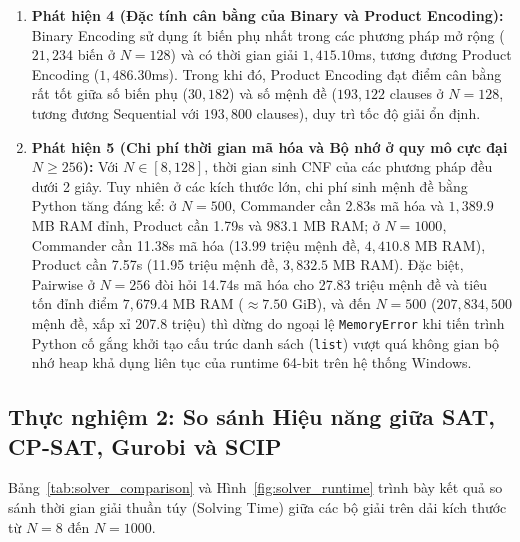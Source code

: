 \documentclass[11pt,a4paper]{article}
\begin{document}
\begin{enumerate}
    \item \textbf{Phát hiện 4 (Đặc tính cân bằng của Binary và Product Encoding):} Binary Encoding sử dụng ít biến phụ nhất trong các phương pháp mở rộng ($21{,}234$ biến ở $N=128$) và có thời gian giải $1{,}415.10$ms, tương đương Product Encoding ($1{,}486.30$ms). Trong khi đó, Product Encoding đạt điểm cân bằng rất tốt giữa số biến phụ ($30{,}182$) và số mệnh đề ($193{,}122$ clauses ở $N=128$, tương đương Sequential với $193{,}800$ clauses), duy trì tốc độ giải ổn định.
    \item \textbf{Phát hiện 5 (Chi phí thời gian mã hóa và Bộ nhớ ở quy mô cực đại $N \ge 256$):} Với $N \in [8, 128]$, thời gian sinh CNF của các phương pháp đều dưới 2 giây. Tuy nhiên ở các kích thước lớn, chi phí sinh mệnh đề bằng Python tăng đáng kể: ở $N=500$, Commander cần 2.83s mã hóa và $1{,}389.9$ MB RAM đỉnh, Product cần 1.79s và $983.1$ MB RAM; ở $N=1000$, Commander cần 11.38s mã hóa (13.99 triệu mệnh đề, $4{,}410.8$ MB RAM), Product cần 7.57s (11.95 triệu mệnh đề, $3{,}832.5$ MB RAM). Đặc biệt, Pairwise ở $N=256$ đòi hỏi 14.74s mã hóa cho 27.83 triệu mệnh đề và tiêu tốn đỉnh điểm $7{,}679.4$ MB RAM ($\approx 7.50$ GiB), và đến $N=500$ ($207{,}834{,}500$ mệnh đề, xấp xỉ 207.8 triệu) thì dừng do ngoại lệ \texttt{MemoryError} khi tiến trình Python cố gắng khởi tạo cấu trúc danh sách (\texttt{list}) vượt quá không gian bộ nhớ heap khả dụng liên tục của runtime 64-bit trên hệ thống Windows.
\end{enumerate}

\subsection{Thực nghiệm 2: So sánh Hiệu năng giữa SAT, CP-SAT, Gurobi và SCIP}
Bảng~\ref{tab:solver_comparison} và Hình~\ref{fig:solver_runtime} trình bày kết quả so sánh thời gian giải thuần túy (Solving Time) giữa các bộ giải trên dải kích thước từ $N=8$ đến $N=1000$.
\end{document}
